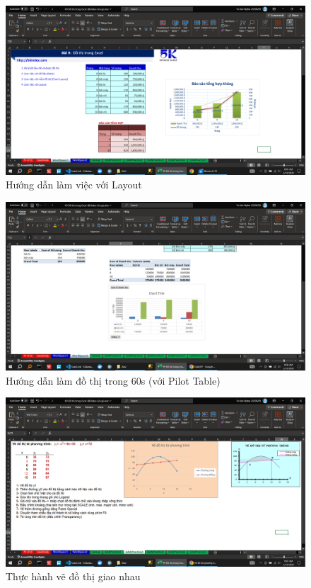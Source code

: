 \documentclass{article}
\begin{document}
\begin{figure}[H]
    \centering
    \includegraphics[scale = 0.15]{Bai2/HuongDan/3.png}
    \caption{Hướng dẫn làm việc với Layout}
\end{figure}




\begin{figure}[H]
    \centering
    \includegraphics[scale = 0.15]{Bai2/HuongDan/4.png}
    \caption{Hướng dẫn làm đồ thị trong 60s (với Pilot Table)}
\end{figure}




\begin{figure}[H]
    \centering
    \includegraphics[scale = 0.15]{Bai2/ThucHanh/0.png}
    \caption{Thực hành vẽ đồ thị giao nhau}
\end{figure}
\end{document}
